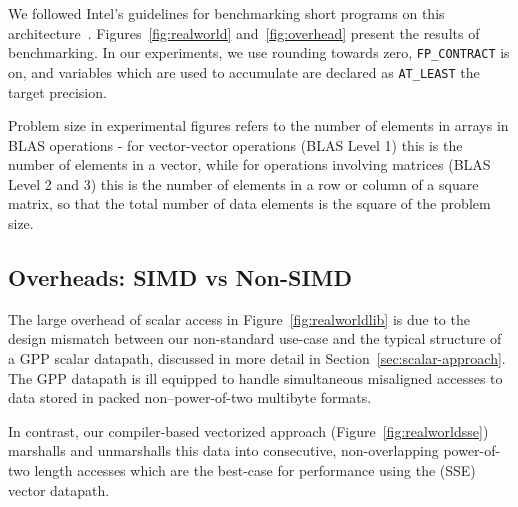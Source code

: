 \documentclass{sig-alternate-05-2015}
\newcommand{\mt}[1]{\texttt{#1}}
\begin{document}
We followed Intel's guidelines for benchmarking short programs on this
architecture~\cite{paoloni2010benchmark}. Figures~\ref{fig:realworld}
and~\ref{fig:overhead} present the results of benchmarking. In our experiments,
we use rounding towards zero, \texttt{FP\_CONTRACT} is on, and variables which
are used to accumulate are declared as \texttt{AT\_LEAST} the target precision.

Problem size in experimental figures refers to the number of elements in arrays
in BLAS operations - for vector-vector operations (BLAS Level 1) this is the
number of elements in a vector, while for operations involving matrices (BLAS
Level 2 and 3) this is the number of elements in a row or column of a square
matrix, so that the total number of data elements is the square of the problem
size.

\begin{figure*}[ht]
\centering

\qquad
{}

\caption{Variation of performance with precision of memory representation
across a number of BLAS kernels. Performance displayed as normalized execution
time (cycles per data element) -- \textbf{lower is better}. Overhead versus
native types can be read as the difference between any \mt{flyte} type and the
next largest native type.}

\label{fig:realworld}

\end{figure*}

\subsection{Overheads: SIMD vs Non-SIMD} The large overhead of scalar access in
Figure~\ref{fig:realworldlib} is due to the design mismatch between our
non-standard use-case and the typical structure of a GPP scalar datapath,
discussed in more detail in Section~\ref{sec:scalar-approach}. The GPP datapath
is ill equipped to handle simultaneous misaligned accesses to data stored in
packed non--power-of-two multibyte formats.

In contrast, our compiler-based vectorized approach
(Figure~\ref{fig:realworldsse}) marshalls and unmarshalls this data into
consecutive, non-overlapping power-of-two length accesses which are the
best-case for performance using the (SSE) vector datapath.
\end{document}
